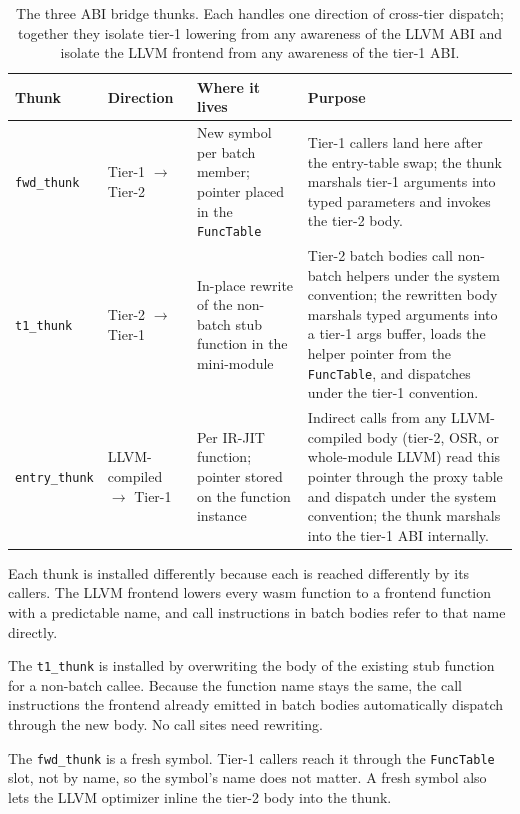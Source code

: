 \begin{table}[h]
\centering
\small
\begin{tabular}{l p{2.6cm} p{3.3cm} p{4.6cm}}
\toprule
Thunk & Direction & Where it lives & Purpose \\
\midrule
\texttt{fwd\_thunk}
  & Tier-1 $\to$ Tier-2
  & New symbol per batch member; pointer placed in the \texttt{FuncTable}
  & Tier-1 callers land here after the entry-table swap; the thunk marshals tier-1 arguments into typed parameters and invokes the tier-2 body. \\
\addlinespace
\texttt{t1\_thunk}
  & Tier-2 $\to$ Tier-1
  & In-place rewrite of the non-batch stub function in the mini-module
  & Tier-2 batch bodies call non-batch helpers under the system convention; the rewritten body marshals typed arguments into a tier-1 args buffer, loads the helper pointer from the \texttt{FuncTable}, and dispatches under the tier-1 convention. \\
\addlinespace
\texttt{entry\_thunk}
  & LLVM-compiled $\to$ Tier-1
  & Per IR-JIT function; pointer stored on the function instance
  & Indirect calls from any LLVM-compiled body (tier-2, OSR, or whole-module LLVM) read this pointer through the proxy table and dispatch under the system convention; the thunk marshals into the tier-1 ABI internally.\\
\bottomrule
\end{tabular}
\caption{The three ABI bridge thunks. Each handles one direction of cross-tier dispatch; together they isolate tier-1 lowering from any awareness of the LLVM ABI and isolate the LLVM frontend from any awareness of the tier-1 ABI.}
\label{tbl:thunks}
\end{table}

Each thunk is installed differently because each is reached differently by its callers. The LLVM frontend lowers every wasm function to a frontend function with a predictable name, and call instructions in batch bodies refer to that name directly.

The \texttt{t1\_thunk} is installed by overwriting the body of the existing stub function for a non-batch callee. Because the function name stays the same, the call instructions the frontend already emitted in batch bodies automatically dispatch through the new body. No call sites need rewriting.

The \texttt{fwd\_thunk} is a fresh symbol. Tier-1 callers reach it through the \texttt{FuncTable} slot, not by name, so the symbol's name does not matter. A fresh symbol also lets the LLVM optimizer inline the tier-2 body into the thunk.

